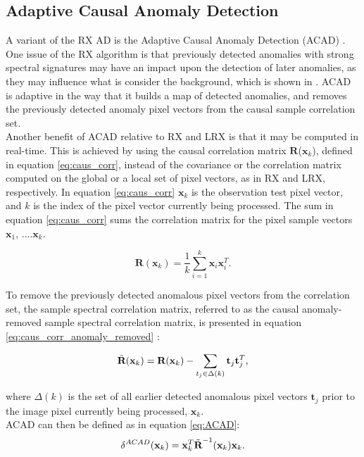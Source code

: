 \subsection{Adaptive Causal Anomaly Detection}
\label{sec:ACAD_theory}
A variant of the RX AD is the Adaptive Causal Anomaly Detection (ACAD) \cite{chang2006characterization}. One issue of the RX algorithm is that previously detected anomalies with strong spectral signatures may have an impact upon the detection of later anomalies, as they may influence what is consider the background, which is shown in \cite{chang2006characterization}. ACAD is adaptive in the way that it builds a map of detected anomalies, and removes the previously detected anomaly pixel vectors from the causal sample correlation set. \\
Another benefit of ACAD relative to RX and LRX is that it may be computed in real-time. This is achieved by using the causal correlation matrix $\textbf{R}$($\textbf{x}_k$), defined in equation \ref{eq:caus_corr}, instead of the covariance or the correlation matrix computed on the global or a local set of pixel vectors, as in RX and LRX, respectively. In equation \ref{eq:caus_corr} $\textbf{x}_k$ is the observation test pixel vector, and $k$ is the index of the pixel vector currently being processed. The sum in equation \ref{eq:caus_corr} sums the correlation matrix for the pixel sample vectors {$\textbf{x}_1$, ....$\textbf{x}_k$}.  

\begin{equation}
    \textbf{R}(\textbf{x}_k)=\frac{1}{k}\sum_{i=1}^k\textbf{x}_i\textbf{x}_i^T. 
    \label{eq:caus_corr}
\end{equation}

To remove the previously detected anomalous pixel vectors from the correlation set, the sample spectral correlation matrix, referred to as the causal anomaly-removed sample spectral correlation matrix, is presented in equation \ref{eq:caus_corr_anomaly_removed}  \cite{chang2006characterization}:

\begin{equation}
    \Tilde{\textbf{R}}(\textbf{x}_k)= \textbf{R}(\textbf{x}_k) - \sum_{t_j\in\Delta(k)}\textbf{t}_j\textbf{t}_j^T ,
    \label{eq:caus_corr_anomaly_removed}
\end{equation}

where $\Delta(k)$ is the set of all earlier detected anomalous pixel vectors $\textbf{t}_j$ prior to the image pixel currently being processed, $\textbf{x}_k$.
\\
ACAD can then be defined as in equation \ref{eq:ACAD}:
\begin{equation}
    \delta^{ACAD}(\textbf{x}_k)= \textbf{x}_k^T\Tilde{\textbf{R}}^{-1}(\textbf{x}_k)\textbf{x}_k.
    \label{eq:ACAD}
\end{equation}

